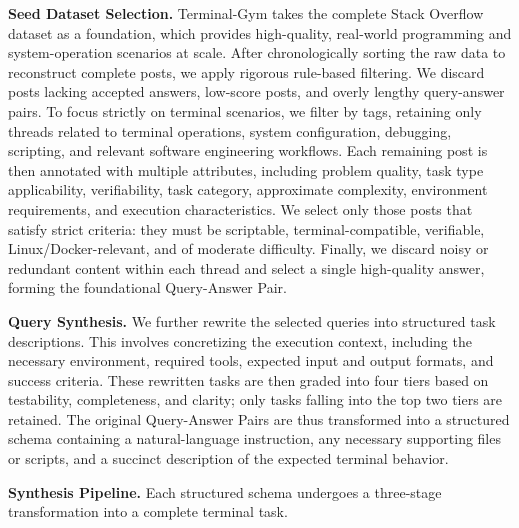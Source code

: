 \noindent \textbf{Seed Dataset Selection.} Terminal-Gym takes the complete Stack Overflow dataset as a foundation, which provides high-quality, real-world programming and system-operation scenarios at scale. After chronologically sorting the raw data to reconstruct complete posts, we apply rigorous rule-based filtering. We discard posts lacking accepted answers, low-score posts, and overly lengthy query-answer pairs. To focus strictly on terminal scenarios, we filter by tags, retaining only threads related to terminal operations, system configuration, debugging, scripting, and relevant software engineering workflows. Each remaining post is then annotated with multiple attributes, including problem quality, task type applicability, verifiability, task category, approximate complexity, environment requirements, and execution characteristics. We select only those posts that satisfy strict criteria: they must be scriptable, terminal-compatible, verifiable, Linux/Docker-relevant, and of moderate difficulty. Finally, we discard noisy or redundant content within each thread and select a single high-quality answer, forming the foundational Query-Answer Pair.

\noindent \textbf{Query Synthesis.} We further rewrite the selected queries into structured task descriptions. This involves concretizing the execution context, including the necessary environment, required tools, expected input and output formats, and success criteria. These rewritten tasks are then graded into four tiers based on testability, completeness, and clarity; only tasks falling into the top two tiers are retained. The original Query-Answer Pairs are thus transformed into a structured schema containing a natural-language instruction, any necessary supporting files or scripts, and a succinct description of the expected terminal behavior.

\noindent \textbf{Synthesis Pipeline.} Each structured schema undergoes a three-stage transformation into a complete terminal task.

